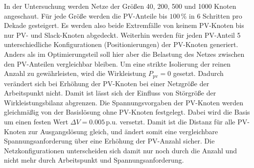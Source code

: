 In der Untersuchung werden Netze der Größen 40, 200, 500 und 1000 Knoten angeschaut.
Für jede Größe werden die PV-Anteile bis $100\,\%$ in 6 Schritten pro Dekade gesteigert.
Es werden also beide Extremfälle von keinem PV-Knoten bis nur PV- und Slack-Knoten abgedeckt.
Weiterhin werden für jeden PV-Anteil 5 unterschiedliche Konfigurationen (Positionierungen) der PV-Knoten generiert.\\

Anders als im Optimierungsteil soll hier aber die Belastung des Netzes zwischen den PV-Anteilen vergleichbar bleiben.
Um eine strikte Isolierung der reinen Anzahl zu gewährleisten, wird die Wirkleistung $P_\mathrm{pv} = 0$ gesetzt.
Dadurch verändert sich bei Erhöhung der PV-Knoten bei einer Netzgröße der Arbeitspunkt nicht.
Damit ist lässt sich der Einfluss von Störgröße der Wirkleistungsbilanz abgrenzen.
Die Spannungsvorgaben der PV-Knoten werden gleichmäßig von der Basislösung ohne PV-Knoten festgelegt.
Dabei wird die Basis um einen festen Wert $\Delta V = 0.005\,\mathrm{p.u.}$ versetzt.
Damit ist die Distanz für alle PV-Knoten zur Ausgangslösung gleich, und ändert somit eine vergleichbare Spannungsanforderung über eine Erhöhung der PV-Anzahl sicher.
Die Netzkonfigurationen unterscheiden sich damit nur noch durch die Anzahl und nicht mehr durch Arbeitspunkt und Spannungsanforderung.\\

